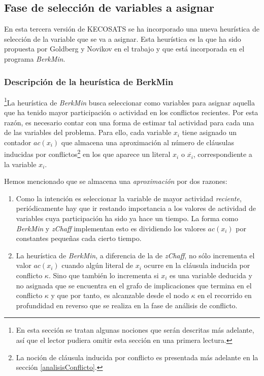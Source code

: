 \documentclass[12pt,lettersize,oneside]{article}
\begin{document}
\subsection{Fase de selección de variables a asignar}\label{ProxVariable}

En esta tercera versión de KECOSATS se ha incorporado una nueva heurística de
selección de la variable que se va a asignar. Esta heurística es la que ha sido
propuesta por Goldberg y Novikov en el trabajo \cite{goldberg} y que está
incorporada en el programa \emph{BerkMin}.

\subsubsection{Descripción de la heurística de BerkMin}\label{TeoHeur}
\footnote{En esta sección se tratan algunas nociones que serán descritas más
  adelante, así que el lector pudiera omitir esta sección en una primera
  lectura.}La heurística de \emph{BerkMin} busca seleccionar como variables para
asignar aquella que ha tenido mayor participación o actividad en los conflictos
recientes. Por esta razón, es necesario contar con una forma de estimar tal
actividad para cada una de las variables del problema. Para ello, cada variable
$x_i$ tiene asignado un contador $ac(x_i)$ que almacena una aproximación al
número de cláusulas inducidas por conflictos\footnote{La noción de cláusula
  inducida por conflicto es presentada más adelante en la sección
  \ref{analisisConflicto}.} en los que aparece un literal $x_i$ o
$\overline{x_i}$, correspondiente a la variable $x_i$.

Hemos mencionado que se almacena una \emph{aproximación} por dos razones:
\vspace{-2.5mm}
\begin{enumerate}
\item Como la intención es seleccionar la variable de mayor actividad
  \emph{reciente}, periódicamente hay que ir restando importancia a los valores
  de actividad de variables cuya  participación ha sido ya hace un tiempo. La
  forma como \emph{BerkMin} y \emph{zChaff} implementan esto es dividiendo los
  valores $ac(x_i)$ por constantes pequeñas cada cierto tiempo.
\item La heurística de \emph{BerkMin}, a diferencia de la de \emph{zChaff}, no
  sólo incrementa el valor $ac(x_i)$ cuando algún literal de $x_i$ ocurre en la
  cláusula inducida por conflicto $\kappa$. Sino que también lo incrementa si
  $x_i$ es una variable deducida y no asignada que se encuentra en el grafo de
  implicaciones que termina en el conflicto $\kappa$ y que por tanto, es
  alcanzable desde el nodo $\kappa$ en el recorrido en profundidad en reverso
  que se realiza en la fase de análisis de conflicto.
\end{enumerate}
\end{document}
